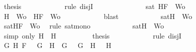 \begin{isabellebody}
\ {\isacharquery}thesis\isanewline
\ \ \ \ \ \ \ \ \ \ \isamarkupfalse%
\ {\isacharparenleft}rule\ disjI{}{\isacharparenright}\isanewline
\ \ \ \ \isamarkupfalse%
\isanewline
\ \ \ \ \ \ \ \ \isamarkupfalse%
\ {\isachardoublequoteopen}sat\ {\isacharparenleft}{\isacharbraceleft}H{}{\isacharcomma}F{\isacharbraceright}\ {\isasymunion}\ Wo{\isacharparenright}{\isachardoublequoteclose}\isanewline
\ \ \ \ \ \ \ \ \isamarkupfalse%
\ {\isachardoublequoteopen}{\isacharbraceleft}H{}{\isacharbraceright}\ {\isasymunion}\ Wo\ {\isasymsubseteq}\ {\isacharbraceleft}H{}{\isacharcomma}F{\isacharbraceright}\ {\isasymunion}\ Wo{\isachardoublequoteclose}\isanewline
\ \ \ \ \ \ \ \ \ \ \isamarkupfalse%
\ blast\isanewline
\ \ \ \ \ \ \ \ \isamarkupfalse%
\ \isamarkupfalse%
\ {\isachardoublequoteopen}sat{\isacharparenleft}{\isacharbraceleft}H{}{\isacharbraceright}\ {\isasymunion}\ Wo{\isacharparenright}{\isachardoublequoteclose}\isanewline
\ \ \ \ \ \ \ \ \ \ \isamarkupfalse%
\ {\isacartoucheopen}sat{\isacharparenleft}{\isacharbraceleft}H{}{\isacharcomma}F{\isacharbraceright}\ {\isasymunion}\ Wo{\isacharparenright}{\isacartoucheclose}\ \isamarkupfalse%
\ {\isacharparenleft}rule\ sat{\isacharunderscore}mono{\isacharparenright}\isanewline
\ \ \ \ \ \ \ \ \isamarkupfalse%
\ \isamarkupfalse%
\ {\isachardoublequoteopen}sat{\isacharparenleft}{\isacharbraceleft}H{\isacharbraceright}\ {\isasymunion}\ Wo{\isacharparenright}{\isachardoublequoteclose}\isanewline
\ \ \ \ \ \ \ \ \ \ \isamarkupfalse%
\ {\isacharparenleft}simp\ only{\isacharcolon}\ {\isacartoucheopen}H\ {\isacharequal}\ H{}{\isacartoucheclose}{\isacharparenright}\isanewline
\ \ \ \ \ \ \ \ \isamarkupfalse%
\ {\isacharquery}thesis\isanewline
\ \ \ \ \ \ \ \ \ \ \isamarkupfalse%
\ {\isacharparenleft}rule\ disjI{}{\isacharparenright}\isanewline
\ \ \ \ \ \ \isamarkupfalse%
\isanewline
\ \ \ \ \isamarkupfalse%
\isanewline
\ \ \ \ \ \ \isamarkupfalse%
\ {\isachardoublequoteopen}{\isacharparenleft}{\isasymexists}G{}\ H{}{\isachardot}\ F\ {\isacharequal}\ \isactrlbold {\isasymnot}\ {\isacharparenleft}G{}\ \isactrlbold {\isasymand}\ H{}{\isacharparenright}\ {\isasymand}\ G\ {\isacharequal}\ \isactrlbold {\isasymnot}\ G{}\ {\isasymand}\ H\ {\isacharequal}\ \isactrlbold {\isasymnot}\ H{}{\isacharparenright}\ {\isasymor}\ \isanewline

\end{isabellebody}
